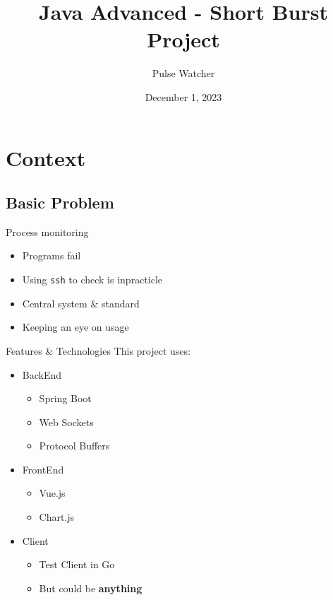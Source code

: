 \documentclass{beamer}
\title[Pulse Watcher]
{Java Advanced - Short Burst Project}
\subtitle
{Pulse Watcher}
\date{December 1, 2023}
\institute[Universities of Somewhere and Elsewhere]
{
  EHB\\
  Brussels}
\begin{document}
\begin{frame}
  \titlepage
\end{frame}





\section{Context}

\subsection{Basic Problem}

\begin{frame}{Process monitoring}
  \begin{itemize}
  \item Programs fail
  \item Using \texttt{ssh} to check is inpracticle
  \item Central system \& standard
  \item Keeping an eye on usage
  \end{itemize}
\end{frame}

\begin{frame}{Features \& Technologies}
  This project uses:
  \begin{itemize}
  \item BackEnd
    \begin{itemize}
    \item Spring Boot
    \item Web Sockets
	\item Protocol Buffers
    \end{itemize}
  \item FrontEnd
    \begin{itemize}
    \item Vue.js
    \item Chart.js
    \end{itemize}
  \item Client
    \begin{itemize}
      \item Test Client in Go
      \item But could be {\bf anything}
    \end{itemize}
  \end{itemize}
\end{frame}
\end{document}
